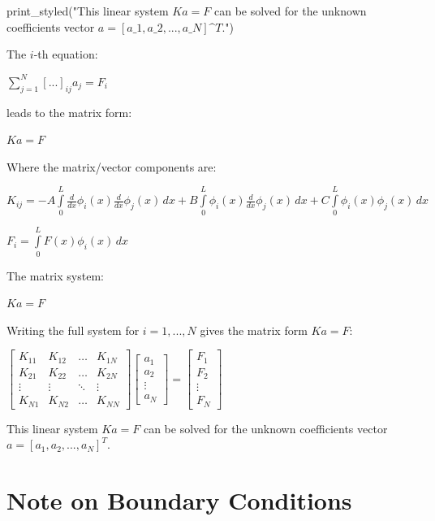 \documentclass[
  11pt,
  a4paper,
]{scrbook}
\newenvironment{Shaded}{\begin{snugshade}}{\end{snugshade}}
\newcommand{\InformationTok}[1]{\textcolor[rgb]{0.37,0.37,0.37}{#1}}
\begin{document}
\begin{Shaded}
\begin{Highlighting}[]
\InformationTok{print\_styled("This linear system $Ka = F$ can be solved for the unknown coefficients vector $a = [a\_1, a\_2, ..., a\_N]\^{}T$.")}
\InformationTok{\textasciigrave{}\textasciigrave{}\textasciigrave{}}
\end{Highlighting}
\end{Shaded}

The \(i\)-th equation:

\(\sum_{j=1}^N [ ... ]_{ij} a_j = F_i\)

leads to the matrix form:

\(K a = F\)

Where the matrix/vector components are:

$\displaystyle K_{ij} = - A \int\limits_{0}^{L} \frac{d}{d x} \phi_{i}(x) \frac{d}{d x} \phi_{j}(x)\, dx + B \int\limits_{0}^{L} \phi_{i}(x) \frac{d}{d x} \phi_{j}(x)\, dx + C \int\limits_{0}^{L} \phi_{i}(x) \phi_{j}(x)\, dx$

$\displaystyle F_{i} = \int\limits_{0}^{L} F{\left(x \right)} \phi_{i}(x)\, dx$

The matrix system:

$\displaystyle K a = F$

Writing the full system for \(i=1, ..., N\) gives the matrix form
\(Ka=F\):

$\displaystyle 
\begin{bmatrix}
K_{11} & K_{12} & \dots & K_{1N} \\
K_{21} & K_{22} & \dots & K_{2N} \\
\vdots & \vdots & \ddots & \vdots \\
K_{N1} & K_{N2} & \dots & K_{NN}
\end{bmatrix}
\begin{bmatrix}
a_{1} \\
a_{2} \\
\vdots \\
a_{N}
\end{bmatrix}
=
\begin{bmatrix}
F_{1} \\
F_{2} \\
\vdots \\
F_{N}
\end{bmatrix}
$

This linear system \(Ka = F\) can be solved for the unknown coefficients
vector \(a = [a_1, a_2, ..., a_N]^T\).

\section{Note on Boundary Conditions}\label{note-on-boundary-conditions}
\end{document}
